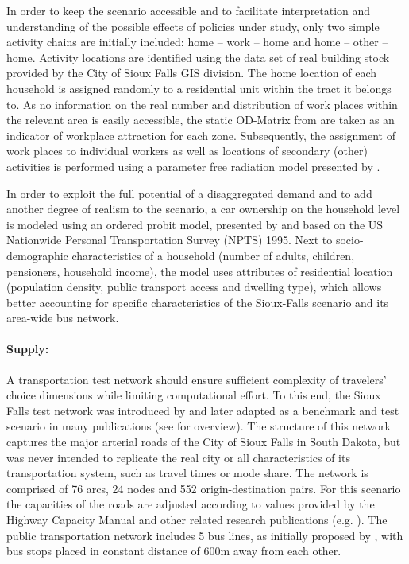 In order to keep the scenario accessible and to facilitate interpretation and understanding of the possible effects of policies under study, only two simple activity chains are initially included: home – work – home and home – other – home. Activity locations are identified using the data set of real building stock provided by the City of Sioux Falls GIS division. The home location of each household is assigned randomly to a residential unit within the tract it belongs to. As no information on the real number and distribution of work places within the relevant area is easily accessible, the static OD-Matrix from \citet[][]{LeBlancEtAl_TransRes_1975} are taken as an indicator of workplace attraction for each zone. Subsequently, the assignment of work places to individual workers as well as locations of secondary (other) activities is performed using a parameter free radiation model presented by \citet[][]{SiminiEtAl_NAT_2012}.

In order to exploit the full potential of a disaggregated demand and to add another degree of realism to the scenario, a car ownership on the household level is modeled using an ordered probit model, presented by \cite[][]{GiulianoDargay_TransResA_2006} and based on the US Nationwide Personal Transportation Survey (NPTS) 1995. Next to socio-demographic characteristics of a household (number of adults, children, pensioners, household income), the model uses attributes of residential location (population density, public transport access and dwelling type), which allows better accounting for specific characteristics of the Sioux-Falls scenario and its area-wide bus network. 

\paragraph{Supply:} 

A transportation test network should ensure sufficient complexity of travelers’ choice dimensions while limiting computational effort. To this end, the Sioux Falls test network was introduced by \citet[][]{MorlokEtAl_ResRep_org-fhwa_1973} and later adapted as a benchmark and test scenario in many publications (see \citet[][]{ChakirovFourie_TechRep_FCL_2014} for overview). The structure of this network captures the major arterial roads of the City of Sioux Falls in South Dakota, but was never intended to replicate the real city or all characteristics of its transportation system, such as travel times or mode share. The network is comprised of 76 arcs, 24 nodes and 552 origin-destination pairs. For this scenario the capacities of the roads are adjusted according to values provided by the Highway Capacity Manual \citet[][]{HCM_2010} and other related research publications (e.g. \citet[][]{NgCFSmall_Transportation_2012}). The public transportation network includes 5 bus lines, as initially proposed by \citet[][]{AbdulaalLeBlanc_TransScience_1979}, with bus stops placed in constant distance of 600m away from each other. 

